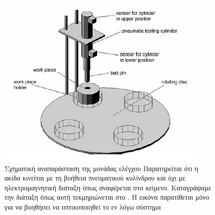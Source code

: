 \documentclass[a4paper,12pt,twoside]{report}
\begin{document}
				\begin{figure}[hp]
					\centering
					\includegraphics[scale=0.75]{ProcessingStationTestingModuleTrambo.png}
					\caption{Σχηματική αναπαράσταση της μονάδας ελέγχου \cite{ΤοΦυσικόΣύστημαFestoMPS} {\footnotesize Παρατηρείται ότι η ακίδα κινείται με τη βοήθεια πνευματικού κυλίνδρου και όχι με ηλεκτρομαγνητική διάταξη όπως αναφέρεται στο κείμενο. Καταγράψαμε την διάταξη όπως αυτή τεκμηριώνεται στο \cite{FestoMPSProcessingStationManual}. Η εικόνα παρατίθεται μόνο για να βοηθήσει να οπτικοποιηθεί το εν λόγω σύστημα}}
					\label{φωτ:Σχηματική αναπαράσταση της μονάδας ελέγχου από Θράμπο}
				\end{figure}			
				
\end{document}

